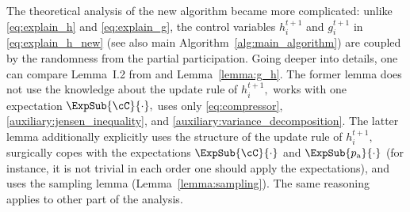 \documentclass{article}
\newcommand{\algorithmname}{DASHA-PP}
\newcommand*{\probavailable}{\ensuremath{p_{\textnormal{a}}}}
\begin{document}
The theoretical analysis of the new algorithm became more complicated: unlike \eqref{eq:explain_h} and \eqref{eq:explain_g}, the control variables $h^{t+1}_i$ and $g^{t+1}_i$ in \eqref{eq:explain_h_new} (see also main Algorithm~\ref{alg:main_algorithm}) are coupled by the randomness from the partial participation. 
Going deeper into details, one can compare Lemma~I.2 from \citep{tyurin2022dasha} and Lemma~\ref{lemma:g_h}. The former lemma does not use the knowledge about the update rule of $h^{t+1}_i,$ works with one expectation $\ExpSub{\cC}{\cdot},$ uses only \eqref{eq:compressor}, \eqref{auxiliary:jensen_inequality}, and \eqref{auxiliary:variance_decomposition}. The latter lemma additionally explicitly uses the structure of the update rule of $h^{t+1}_i,$ surgically copes with the expectations $\ExpSub{\cC}{\cdot}$ and $\ExpSub{\probavailable}{\cdot}$ (for instance, it is not trivial in each order one should apply the expectations), and uses the sampling lemma (Lemma~\ref{lemma:sampling}). The same reasoning applies to other part of the analysis. 


\end{document}
